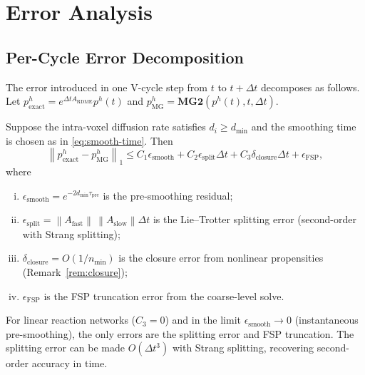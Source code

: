 \documentclass[review,onefignum,onetabnum]{siamart171218}
\newcommand{\norm}[1]{\left\|#1\right\|}
\begin{document}
\section{Error Analysis}
\label{sec:error}

\subsection{Per-Cycle Error Decomposition}

The error introduced in one V-cycle step from $t$ to $t+\Delta t$
decomposes as follows.  Let
$p_{\mathrm{exact}}^h = e^{\Delta t A_{\mathrm{RDME}}} p^h(t)$
and $p_{\mathrm{MG}}^h = \mathbf{MG2}(p^h(t), t, \Delta t)$.

\begin{theorem}
  \label{thm:vcycle-error}
  Suppose the intra-voxel diffusion rate satisfies
  $d_i \geq d_{\min}$ and the smoothing time is chosen as
  in \eqref{eq:smooth-time}.  Then
  \begin{equation}
    \label{eq:vcycle-error}
    \norm{p_{\mathrm{exact}}^h - p_{\mathrm{MG}}^h}_1
    \leq C_1 \epsilon_{\mathrm{smooth}}
         + C_2 \epsilon_{\mathrm{split}} \Delta t
         + C_3 \delta_{\mathrm{closure}} \Delta t
         + \epsilon_{\mathrm{FSP}},
  \end{equation}
  where
  \begin{enumerate}[(i)]
    \item $\epsilon_{\mathrm{smooth}} =
           e^{-2 d_{\min} \tau_{\mathrm{pre}}}$
           is the pre-smoothing residual;
    \item $\epsilon_{\mathrm{split}} = \norm{A_{\mathrm{fast}}}\,
           \norm{A_{\mathrm{slow}}} \Delta t$
           is the Lie--Trotter splitting error (second-order with
           Strang splitting);
    \item $\delta_{\mathrm{closure}} = O(1/n_{\min})$ is the
           closure error from nonlinear propensities
           (Remark~\ref{rem:closure});
    \item $\epsilon_{\mathrm{FSP}}$ is the FSP truncation error
          from the coarse-level solve.
  \end{enumerate}
\end{theorem}

\begin{remark}
  For linear reaction networks ($C_3 = 0$) and in the limit
  $\epsilon_{\mathrm{smooth}} \to 0$ (instantaneous pre-smoothing),
  the only errors are the splitting error and FSP truncation.  The
  splitting error can be made $O(\Delta t^3)$ with Strang splitting,
  recovering second-order accuracy in time.
\end{remark}
\end{document}
